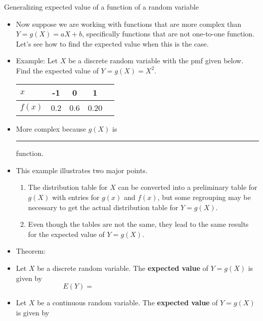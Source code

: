 \documentclass{article}
\newcommand{\blankul}[1]{\rule[-1.5mm]{#1}{0.15mm}}	%
\begin{document}
Generalizing expected value of a function of a random variable\bigskip
\begin{itemize}
    \item Now suppose we are working with functions that are more complex than $Y = g(X) = aX + b$, specifically functions that are not one-to-one function. Let's see how to find the expected value when this is the case.
    \item Example: Let $X$ be a discrete random variable with the pmf given below. Find the expected value of $Y = g(X) = X^2$.\bigskip\\
    \begin{tabular}{| l || c | c | c | c |}
        \hline
        $x$ \hspace{20pt} & \hspace{10pt} -1 \hspace{10pt} & \hspace{10pt} 0 \hspace{10pt} & \hspace{10pt} 1 \hspace{10pt} \\
        \hline
        $f(x)$ & 0.2 & 0.6 & 0.20\\
        \hline
    \end{tabular}\vspace{100pt}
    \item[] More complex because $g(X)$ is \blankul{5cm} function.
    \item This example illustrates two major points.
    \begin{enumerate}
        \item The distribution table for $X$ can be converted into a preliminary table for $g(X)$ with entries for $g(x)$ and $f(x)$, but some regrouping may be necessary to get the actual distribution table for $Y = g(X)$.
        \item Even though the tables are not the same, they lead to the same results for the expected value of $Y = g(X)$.
    \end{enumerate}\bigskip
    \item Theorem:
    \item[] Let $X$ be a discrete random variable. The \textbf{expected value} of $Y = g(X)$ is given by\smallskip
    \[E(Y) = \hspace{200pt}\]\vspace{30pt}
    \item[] Let $X$ be a continuous random variable. The \textbf{expected value} of $Y = g(X)$ is given by\smallskip

\end{itemize}
\end{document}
